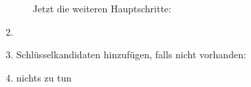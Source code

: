 \documentclass{lehramt-informatik-aufgabe}
\begin{document}
\begin{liAntwort}
\begin{enumerate}
\begin{enumerate}

Jetzt die weiteren Hauptschritte:

\end{enumerate}

\item {}


\item {}

Schlüsselkandidaten hinzufügen, falls nicht vorhanden:


\item {}

nichts zu tun

\end{enumerate}
\end{liAntwort}
\end{document}
